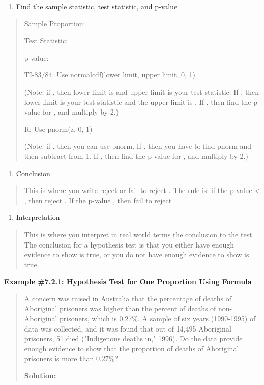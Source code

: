 \documentclass[]{book}
\providecommand{\tightlist}{%
  \setlength{\itemsep}{0pt}\setlength{\parskip}{0pt}}
\begin{document}
\begin{enumerate}
\def\labelenumi{\arabic{enumi}.}
\setcounter{enumi}{3}
\tightlist
\item
  Find the sample statistic, test statistic, and p-value
\end{enumerate}

\begin{quote}
Sample Proportion:

Test Statistic:

p-value:

TI-83/84: Use normalcdf(lower limit, upper limit, 0, 1)

(Note: if , then lower limit is and upper limit is your test
statistic. If , then lower limit is your test statistic and the upper
limit is . If , then find the p-value for , and multiply by 2.)

R: Use pnorm(z, 0, 1)

(Note: if , then you can use pnorm. If , then you have to find pnorm
and then subtract from 1. If , then find the p-value for , and
multiply by 2.)
\end{quote}

\begin{enumerate}
\def\labelenumi{\arabic{enumi}.}
\setcounter{enumi}{4}
\tightlist
\item
  Conclusion
\end{enumerate}

\begin{quote}
This is where you write reject or fail to reject . The rule is: if the
p-value \textless{} , then reject . If the p-value , then fail to reject
\end{quote}

\begin{enumerate}
\def\labelenumi{\arabic{enumi}.}
\setcounter{enumi}{5}
\tightlist
\item
  Interpretation
\end{enumerate}

\begin{quote}
This is where you interpret in real world terms the conclusion to the
test. The conclusion for a hypothesis test is that you either have
enough evidence to show is true, or you do not have enough evidence to
show is true.
\end{quote}

\textbf{Example \#7.2.1: Hypothesis Test for One Proportion Using Formula}

\begin{quote}
A concern was raised in Australia that the percentage of deaths of
Aboriginal prisoners was higher than the percent of deaths of
non-Aboriginal prisoners, which is 0.27\%. A sample of six years
(1990-1995) of data was collected, and it was found that out of 14,495
Aboriginal prisoners, 51 died ("Indigenous deaths in," 1996). Do the
data provide enough evidence to show that the proportion of deaths of
Aboriginal prisoners is more than 0.27\%?

\textbf{Solution:}
\end{quote}
\end{document}
